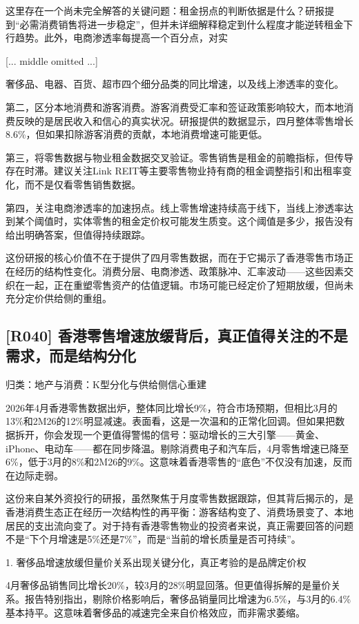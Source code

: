 \documentclass[11pt]{ctexart}
\begin{document}
这里存在一个尚未完全解答的关键问题：租金拐点的判断依据是什么？研报提到“必需消费销售将进一步稳定”，但并未详细解释稳定到什么程度才能逆转租金下行趋势。此外，电商渗透率每提高一个百分点，对实

[... middle omitted ...]

奢侈品、电器、百货、超市四个细分品类的同比增速，以及线上渗透率的变化。

第二，区分本地消费和游客消费。游客消费受汇率和签证政策影响较大，而本地消费反映的是居民收入和信心的真实状况。研报提供的数据显示，四月整体零售增长8.6\%，但如果扣除游客消费的贡献，本地消费增速可能更低。

第三，将零售数据与物业租金数据交叉验证。零售销售是租金的前瞻指标，但传导存在时滞。建议关注Link REIT等主要零售物业持有商的租金调整指引和出租率变化，而不是仅看零售销售数据。

第四，关注电商渗透率的加速拐点。线上零售增速持续高于线下，当线上渗透率达到某个阈值时，实体零售的租金定价权可能发生质变。这个阈值是多少，报告没有给出明确答案，但值得持续跟踪。

这份研报的核心价值不在于提供了四月零售数据，而在于它揭示了香港零售市场正在经历的结构性变化。消费分层、电商渗透、政策脉冲、汇率波动——这些因素交织在一起，正在重塑零售资产的估值逻辑。市场可能已经定价了短期放缓，但尚未充分定价供给侧的重组。

\subsection{[R040] 香港零售增速放缓背后，真正值得关注的不是需求，而是结构分化}
{\small\color{refgray}归类：地产与消费：K型分化与供给侧信心重建}

2026年4月香港零售数据出炉，整体同比增长9\%，符合市场预期，但相比3月的13\%和2M26的12\%明显减速。表面看，这是一次温和的正常化回调。但如果把数据拆开，你会发现一个更值得警惕的信号：驱动增长的三大引擎——黄金、iPhone、电动车——都在同步降温。剔除消费电子和汽车后，4月零售增速已降至6\%，低于3月的8\%和2M26的9\%。这意味着香港零售的“底色”不仅没有加速，反而在边际走弱。

这份来自某外资投行的研报，虽然聚焦于月度零售数据跟踪，但其背后揭示的，是香港消费生态正在经历一次结构性的再平衡：游客结构变了、消费场景变了、本地居民的支出流向变了。对于持有香港零售物业的投资者来说，真正需要回答的问题不是“下个月增速是5\%还是7\%”，而是“当前的增长质量是否可持续”。

1. 奢侈品增速放缓但量价关系出现关键分化，真正考验的是品牌定价权

4月奢侈品销售同比增长20\%，较3月的28\%明显回落。但更值得拆解的是量价关系。报告特别指出，剔除价格影响后，奢侈品销量同比增速为6.5\%，与3月的6.4\%基本持平。这意味着奢侈品的减速完全来自价格效应，而非需求萎缩。
\end{document}
